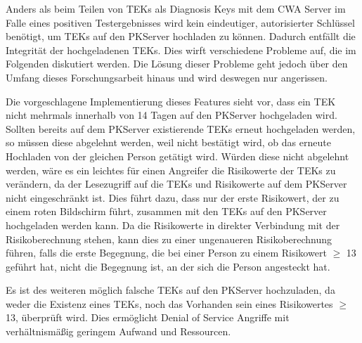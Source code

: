 \documentclass[conference,compsoc]{IEEEtran}
\begin{document}
Anders als beim Teilen von TEKs als Diagnosis Keys mit dem CWA Server im Falle eines positiven Testergebnisses wird kein eindeutiger, autorisierter Schlüssel benötigt, um TEKs auf den PKServer hochladen zu können.
Dadurch entfällt die Integrität der hochgeladenen TEKs.
Dies wirft verschiedene Probleme auf, die im Folgenden diskutiert werden. 
Die Lösung dieser Probleme geht jedoch über den Umfang dieses Forschungsarbeit hinaus und wird deswegen nur angerissen.

Die vorgeschlagene Implementierung dieses Features sieht vor, dass ein TEK nicht mehrmals innerhalb von 14 Tagen auf den PKServer hochgeladen wird.
Sollten bereits auf dem PKServer existierende TEKs erneut hochgeladen werden, so müssen diese abgelehnt werden, weil nicht bestätigt wird, ob das erneute Hochladen von der gleichen Person getätigt wird.
Würden diese nicht abgelehnt werden, wäre es ein leichtes für einen Angreifer die Risikowerte der TEKs zu verändern, da der Lesezugriff auf die TEKs und Risikowerte auf dem PKServer nicht eingeschränkt ist.
Dies führt dazu, dass nur der erste Risikowert, der zu einem roten Bildschirm führt, zusammen mit den TEKs auf den PKServer hochgeladen werden kann.
Da die Risikowerte in direkter Verbindung mit der Risikoberechnung stehen, kann dies zu einer ungenaueren Risikoberechnung führen, 
falls die erste Begegnung, die bei einer Person zu einem Risikowert $\geq$ 13 geführt hat, nicht die Begegnung ist, an der sich die Person angesteckt hat.

Es ist des weiteren möglich falsche TEKs auf den PKServer hochzuladen, da weder die Existenz eines TEKs, noch das Vorhanden sein eines Risikowertes $\geq$ 13, überprüft wird.
Dies ermöglicht Denial of Service Angriffe mit verhältnismäßig geringem Aufwand und Ressourcen.\\
\end{document}

